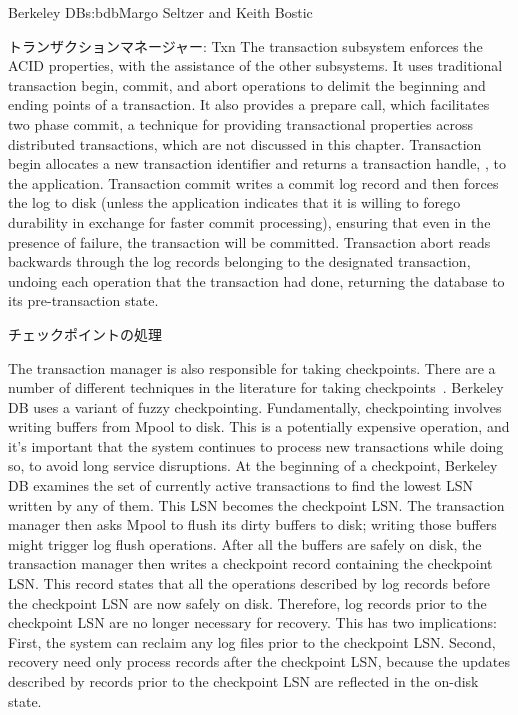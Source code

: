 \begin{aosachapter}{Berkeley DB}{s:bdb}{Margo Seltzer and Keith Bostic}
\begin{aosasect1}{トランザクションマネージャー: Txn}
The transaction subsystem enforces the ACID properties, with the
assistance of the other subsystems. It uses traditional transaction
begin, commit, and abort operations to delimit the beginning and
ending points of a transaction. It also provides a prepare call, which
facilitates two phase commit, a technique for providing transactional
properties across distributed transactions, which are not discussed in
this chapter. Transaction begin allocates a new transaction identifier
and returns a transaction handle, , to the application.
Transaction commit writes a commit log record and then forces the log
to disk (unless the application indicates that it is willing to forego
durability in exchange for faster commit processing), ensuring that
even in the presence of failure, the transaction will be
committed. Transaction abort reads backwards through the log records
belonging to the designated transaction, undoing each operation that
the transaction had done, returning the database to its
pre-transaction state.

\begin{aosasect2}{チェックポイントの処理}


The transaction manager is also responsible for taking checkpoints.
There are a number of different techniques in the literature for
taking checkpoints~\cite{bib:haerder:recovery}. Berkeley DB uses a
variant of fuzzy checkpointing.  Fundamentally, checkpointing involves
writing buffers from Mpool to disk. This is a potentially expensive
operation, and it's important that the system continues to process new
transactions while doing so, to avoid long service disruptions. At the
beginning of a checkpoint, Berkeley DB examines the set of currently
active transactions to find the lowest LSN written by any of
them. This LSN becomes the checkpoint LSN\@. The transaction manager
then asks Mpool to flush its dirty buffers to disk; writing those
buffers might trigger log flush operations. After all the buffers are
safely on disk, the transaction manager then writes a checkpoint
record containing the checkpoint LSN\@.  This record states that all the
operations described by log records before the checkpoint LSN are now
safely on disk.  Therefore, log records prior to the checkpoint LSN
are no longer necessary for recovery. This has two implications:
First, the system can reclaim any log files prior to the checkpoint
LSN\@. Second, recovery need only process records after the checkpoint
LSN, because the updates described by records prior to the checkpoint
LSN are reflected in the on-disk state.


\end{aosasect2}
\end{aosasect1}
\end{aosachapter}
